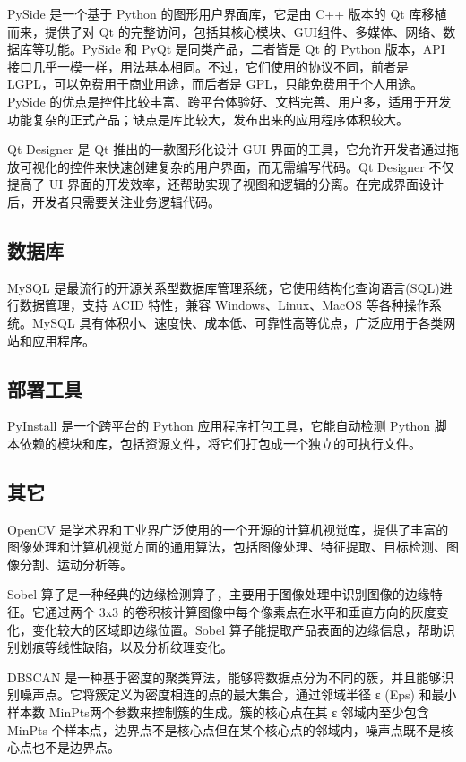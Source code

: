 \documentclass[
  ]{njuthesis}
\begin{document}
PySide 是一个基于 Python 的图形用户界面库，它是由 C++ 版本的 Qt 库移植而来，提供了对 Qt 的完整访问，包括其核心模块、GUI组件、多媒体、网络、数据库等功能。PySide 和 PyQt 是同类产品，二者皆是 Qt 的 Python 版本，API 接口几乎一模一样，用法基本相同。不过，它们使用的协议不同，前者是 LGPL，可以免费用于商业用途，而后者是 GPL，只能免费用于个人用途。PySide 的优点是控件比较丰富、跨平台体验好、文档完善、用户多，适用于开发功能复杂的正式产品；缺点是库比较大，发布出来的应用程序体积较大。

Qt Designer 是 Qt 推出的一款图形化设计 GUI 界面的工具，它允许开发者通过拖放可视化的控件来快速创建复杂的用户界面，而无需编写代码。Qt Designer 不仅提高了 UI 界面的开发效率，还帮助实现了视图和逻辑的分离。在完成界面设计后，开发者只需要关注业务逻辑代码。

\subsection{数据库}

MySQL 是最流行的开源关系型数据库管理系统，它使用结构化查询语言(SQL)进行数据管理，支持 ACID 特性，兼容 Windows、Linux、MacOS 等各种操作系统。MySQL 具有体积小、速度快、成本低、可靠性高等优点，广泛应用于各类网站和应用程序。

\subsection{部署工具}

PyInstall 是一个跨平台的 Python 应用程序打包工具，它能自动检测 Python 脚本依赖的模块和库，包括资源文件，将它们打包成一个独立的可执行文件。

\subsection{其它}

OpenCV 是学术界和工业界广泛使用的一个开源的计算机视觉库，提供了丰富的图像处理和计算机视觉方面的通用算法，包括图像处理、特征提取、目标检测、图像分割、运动分析等。

Sobel 算子是一种经典的边缘检测算子，主要用于图像处理中识别图像的边缘特征。它通过两个 3x3 的卷积核计算图像中每个像素点在水平和垂直方向的灰度变化，变化较大的区域即边缘位置。Sobel 算子能提取产品表面的边缘信息，帮助识别划痕等线性缺陷，以及分析纹理变化。

DBSCAN 是一种基于密度的聚类算法，能够将数据点分为不同的簇，并且能够识别噪声点。它将簇定义为密度相连的点的最大集合，通过邻域半径 ε (Eps) 和最小样本数 MinPts两个参数来控制簇的生成。簇的核心点在其 ε 邻域内至少包含 MinPts 个样本点，边界点不是核心点但在某个核心点的邻域内，噪声点既不是核心点也不是边界点。
\end{document}
